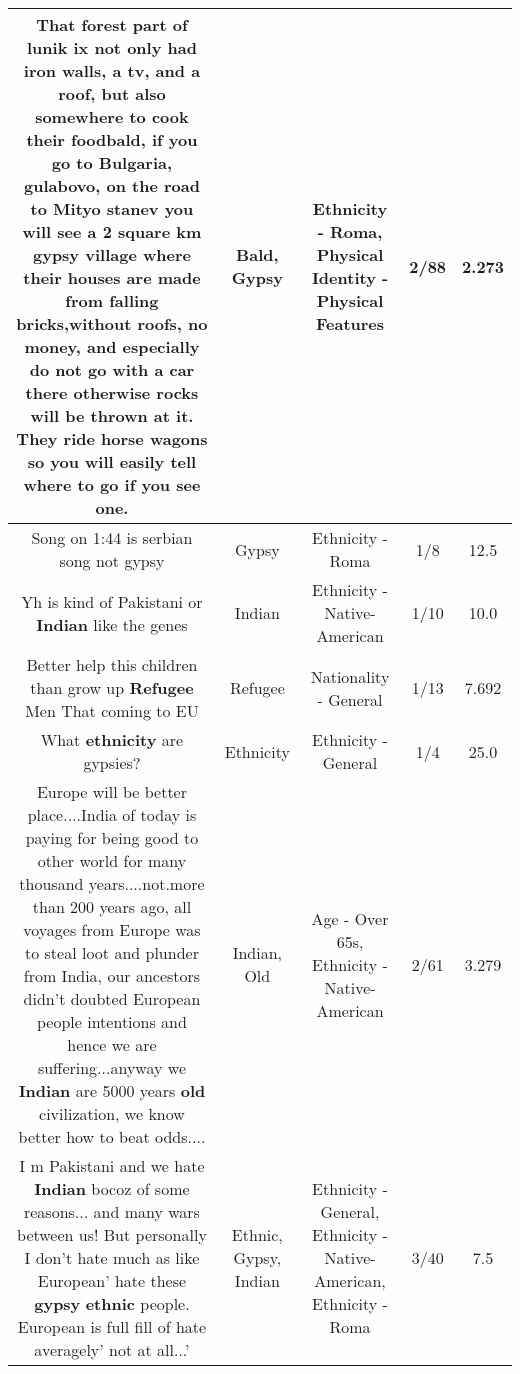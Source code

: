 \documentclass[11pt]{article}
\newlength\mylength
\begin{document}
\begin{center}
\begin{longtable}{|C{.65\mylength}|C{.30\mylength}|C{.12\mylength}|C{.12\mylength}|C{.12\mylength}|}
  \small That forest part of lunik ix not only had iron walls, a tv, and a roof, but also somewhere to cook their food\textbf{bald}, if you go to Bulgaria, gulabovo, on the road to Mityo stanev you will see a 2 square km \textbf{gypsy} village where their houses are made from falling bricks,without roofs, no money, and especially do not go with a car there otherwise rocks will be thrown at it. They ride horse wagons so you will easily tell where to go if you see one.\normalsize   & Bald, Gypsy & Ethnicity - Roma, Physical Identity - Physical Features & 2/88 & 2.273 \\  \hline
  \small Song on 1:44 is serbian song not gypsy\normalsize   & Gypsy & Ethnicity - Roma & 1/8 & 12.5 \\  \hline
  \small Yh is kind of Pakistani or \textbf{Indian} like the genes\normalsize   & Indian & Ethnicity - Native-American & 1/10 & 10.0 \\  \hline
  \small Better help this children than grow up \textbf{Refugee} Men That coming to EU\normalsize   & Refugee & Nationality - General & 1/13 & 7.692 \\  \hline
  \small What \textbf{ethnicity} are gypsies?\normalsize   & Ethnicity & Ethnicity - General & 1/4 & 25.0 \\  \hline
  \small Europe will be better place....India of  today is paying for being good to  other world for many thousand years....not.more than 200 years ago, all voyages from Europe was to steal loot and plunder from India, our ancestors didn't doubted European people intentions and hence we are suffering...anyway we \textbf{Indian} are 5000 years \textbf{old} civilization, we know better how to beat odds....\normalsize   & Indian, Old & Age - Over 65s, Ethnicity - Native-American & 2/61 & 3.279 \\  \hline
  \small I m Pakistani and we hate \textbf{Indian} bocoz of some reasons... and many wars between us! But personally I don't hate much as like European' hate these \textbf{gypsy} \textbf{ethnic} people. European is full fill of hate averagely' not at all...'\normalsize   & Ethnic, Gypsy, Indian & Ethnicity - General, Ethnicity - Native-American, Ethnicity - Roma & 3/40 & 7.5 \\  \hline

\end{longtable}
\end{center}
\end{document}
